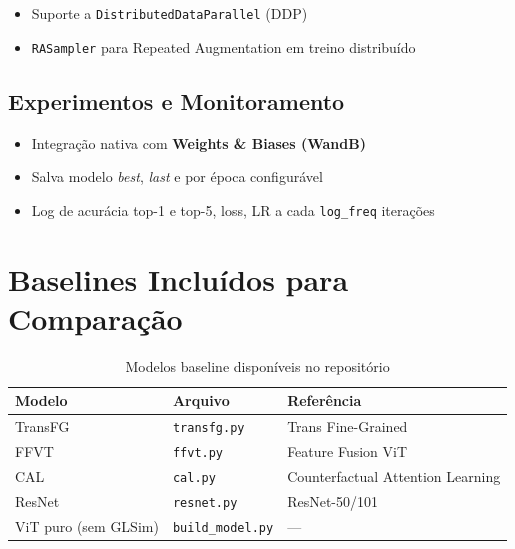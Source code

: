 \documentclass[a4paper,12pt]{scrartcl}
\newenvironment{compactitem}%
  {\begin{itemize}\setlength{\itemsep}{1pt}\setlength{\parsep}{0pt}}%
  {\end{itemize}}
\begin{document}
\begin{compactitem}
  \item Suporte a \texttt{DistributedDataParallel} (DDP)
  \item \texttt{RASampler} para Repeated Augmentation em treino
        distribu\'ido
\end{compactitem}

\subsection{Experimentos e Monitoramento}

\begin{compactitem}
  \item Integra\c{c}\~ao nativa com \textbf{Weights \& Biases (WandB)}
  \item Salva modelo \textit{best}, \textit{last} e por \'epoca
        configur\'avel
  \item Log de acur\'acia top-1 e top-5, loss, LR a cada
        \texttt{log\_freq} itera\c{c}\~oes
\end{compactitem}

\section{Baselines Inclu\'idos para Compara\c{c}\~ao}

\begin{table}[h!]
  \centering
  \caption{Modelos baseline dispon\'iveis no reposit\'orio}
  \begin{tabular}{lll}
    \toprule
    \textbf{Modelo}         & \textbf{Arquivo}            & \textbf{Refer\^encia} \\
    \midrule
    TransFG                 & \texttt{transfg.py}         & Trans Fine-Grained \\
    FFVT                    & \texttt{ffvt.py}            & Feature Fusion ViT \\
    CAL                     & \texttt{cal.py}             & Counterfactual Attention Learning \\
    ResNet                  & \texttt{resnet.py}          & ResNet-50/101 \\
    ViT puro (sem GLSim)    & \texttt{build\_model.py}    & --- \\
    \bottomrule
  \end{tabular}
  \label{tab:baselines}
\end{table}
\end{document}
